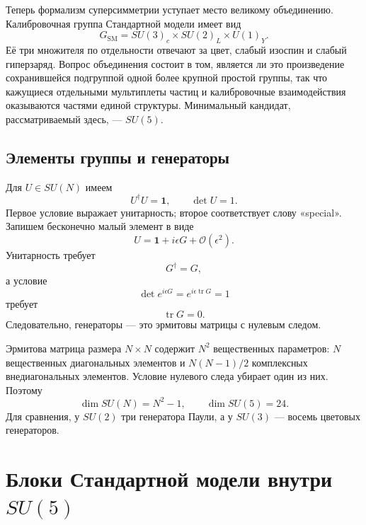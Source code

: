 Теперь формализм суперсимметрии уступает место великому объединению. Калибровочная группа Стандартной модели имеет вид
\begin{equation}
G_{\mathrm{SM}}
=SU(3)_c\times SU(2)_L\times U(1)_Y.
\label{eq:l9-sm-group}
\end{equation}
Её три множителя по отдельности отвечают за цвет, слабый изоспин и слабый гиперзаряд. Вопрос объединения состоит в том, является ли это произведение сохранившейся подгруппой одной более крупной простой группы, так что кажущиеся отдельными мультиплеты частиц и калибровочные взаимодействия оказываются частями единой структуры. Минимальный кандидат, рассматриваемый здесь, — \(SU(5)\).

\subsection{Элементы группы и генераторы}

Для \(U\in SU(N)\) имеем
\begin{equation}
U^\dagger U=\mathbf1,
\qquad
\det U=1.
\label{eq:l9-SUN-def}
\end{equation}
Первое условие выражает унитарность; второе соответствует слову «special». Запишем бесконечно малый элемент в виде
\begin{equation}
U=\mathbf1+i\epsilon G+\mathcal O(\epsilon^2).
\label{eq:l9-infinitesimal-U}
\end{equation}
Унитарность требует
\begin{equation}
G^\dagger=G,
\end{equation}
а условие
\begin{equation}
\det e^{i\epsilon G}
=e^{i\epsilon\operatorname{tr}G}=1
\end{equation}
требует
\begin{equation}
\operatorname{tr}G=0.
\end{equation}
Следовательно, генераторы — это эрмитовы матрицы с нулевым следом.

Эрмитова матрица размера \(N\times N\) содержит \(N^2\) вещественных параметров: \(N\) вещественных диагональных элементов и \(N(N-1)/2\) комплексных внедиагональных элементов. Условие нулевого следа убирает один из них. Поэтому
\begin{equation}
\dim SU(N)=N^2-1,
\qquad
\dim SU(5)=24.
\label{eq:l9-SU5-dimension}
\end{equation}
Для сравнения, у \(SU(2)\) три генератора Паули, а у \(SU(3)\) — восемь цветовых генераторов.

\section{Блоки Стандартной модели внутри \texorpdfstring{\(SU(5)\)}{SU(5)}}

